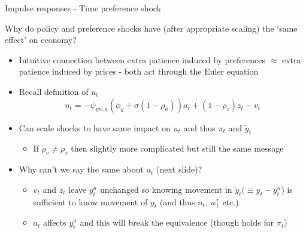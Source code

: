 \documentclass{beamer}
\begin{document}
\begin{frame}{Impulse responses - Time preference shock}

Why do policy and preference shocks have (after appropriate scaling) the `same effect' on economy?
\begin{itemize}
\item	Intuitive connection between extra patience induced by preferences $\approx$ extra patience induced by prices - both act through the Euler equation
\item	Recall definition of $u_{t}$
\[
u_{t} = -\psi_{yn,a}\left( \phi_{y} + \sigma(1-\rho_{a}) \right)a_{t} + (1-\rho_{z})z_{t} - v_{t}
\]

\item	Can scale shocks to have same impact on $u_{t}$ and thus $\pi_{t}$ and $\tilde{y}_{t}$
	\begin{itemize}
	\item	If $\rho_{v} \neq \rho_{z}$ then slightly more complicated but still the same message
	\end{itemize}
\item	Why can't we say the same about $a_{t}$ (next slide)?
	\begin{itemize}
	\item	$v_{t}$ and $z_{t}$ leave $y^{n}_{t}$ unchanged so knowing movement in $\tilde{y}_{t}(\equiv y_{t}-y^{n}_{t}$) is sufficient to know movement of $y_{t}$ (and thus $n_{t}$, $w^{r}_{t}$ etc.)
	\item	$a_{t}$ affects $y^{n}_{t}$ and this will break the equivalence (though holds for $\pi_{t}$)
	\end{itemize}
\end{itemize}

\end{frame}


	
\end{document}

